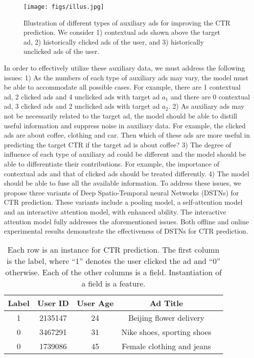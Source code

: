 \documentclass[sigconf]{acmart}
\begin{document}
\begin{figure}[!t]
\centering
\texttt{[image: figs/illus.jpg]}
\vskip -8pt
\caption{Illustration of different types of auxiliary ads for improving the CTR prediction. We consider 1) contextual ads shown above the target ad, 2) historically clicked ads of the user, and 3) historically unclicked ads of the user.}
\vskip -5pt
\label{illus}
\end{figure}

In order to effectively utilize these auxiliary data, we must address the following issues: 1) As the numbers of each type of auxiliary ads may vary, the model must be able to accommodate all possible cases. For example, there are 1 contextual ad, 2 clicked ads and 4 unclicked ads with target ad $a_1$ and there are 0 contextual ad, 3 clicked ads and 2 unclicked ads with target ad $a_2$. 2) As auxiliary ads may not be necessarily related to the target ad, the model should be able to distill useful information and suppress noise in auxiliary data. For example, the clicked ads are about coffee, clothing and car. Then which of these ads are more useful in predicting the target CTR if the target ad is about coffee? 3) The degree of influence of each type of auxiliary ad could be different and the model should be able to differentiate their contributions. For example, the importance of contextual ads and that of clicked ads should be treated differently. 4) The model should be able to fuse all the available information.
To address these issues, we propose three variants of Deep Spatio-Temporal neural Networks (DSTNs) for CTR prediction. These variants include a pooling model, a self-attention model and an interactive attention model, with enhanced ability. The interactive attention model fully addresses the aforementioned issues. Both offline and online experimental results demonstrate the effectiveness of DSTNs for CTR prediction.

\begin{table}[!t]
\caption{Each row is an instance for CTR prediction. The first column is the label, where ``1'' denotes the user clicked the ad and ``0'' otherwise. Each of the other columns is a field. Instantiation of a field is a feature.}
\vskip -8pt
\label{tab_ft}
\centering
\begin{tabular}{|c|c|c|c|c|}
\hline
\textbf{Label} & \textbf{User ID} & \textbf{User Age} & \textbf{Ad Title} \\
\hline
1 & 2135147 & 24 & Beijing flower delivery \\
\hline
0 & 3467291 & 31 & Nike shoes, sporting shoes \\
\hline
0 & 1739086 & 45 & Female clothing and jeans \\
\hline
\end{tabular}
\vskip -8pt
\end{table}
\end{document}

